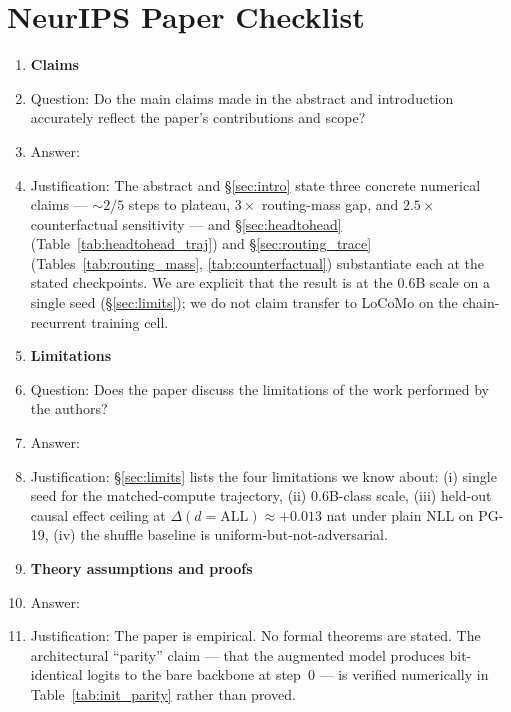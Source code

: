 
\section*{NeurIPS Paper Checklist}

\begin{enumerate}

\item {\bf Claims}
    \item[] Question: Do the main claims made in the abstract and introduction accurately reflect the paper's contributions and scope?
    \item[] Answer: \answerYes{}
    \item[] Justification: The abstract and \S\ref{sec:intro} state three concrete numerical claims --- ${\sim}2/5$ steps to plateau, $3\times$ routing-mass gap, and $2.5\times$ counterfactual sensitivity --- and \S\ref{sec:headtohead} (Table~\ref{tab:headtohead_traj}) and \S\ref{sec:routing_trace} (Tables~\ref{tab:routing_mass}, \ref{tab:counterfactual}) substantiate each at the stated checkpoints.  We are explicit that the result is at the $0.6$B scale on a single seed (\S\ref{sec:limits}); we do not claim transfer to LoCoMo on the chain-recurrent training cell.

\item {\bf Limitations}
    \item[] Question: Does the paper discuss the limitations of the work performed by the authors?
    \item[] Answer: \answerYes{}
    \item[] Justification: \S\ref{sec:limits} lists the four limitations we know about: (i) single seed for the matched-compute trajectory, (ii) $0.6$B-class scale, (iii) held-out causal effect ceiling at $\Delta(d{=}\mathrm{ALL}) \approx +0.013$ nat under plain NLL on PG-19, (iv) the shuffle baseline is uniform-but-not-adversarial.

\item {\bf Theory assumptions and proofs}
    \item[] Answer: \answerNA{}
    \item[] Justification: The paper is empirical.  No formal theorems are stated.  The architectural ``parity'' claim --- that the augmented model produces bit-identical logits to the bare backbone at step~$0$ --- is verified numerically in Table~\ref{tab:init_parity} rather than proved.


\end{enumerate}
